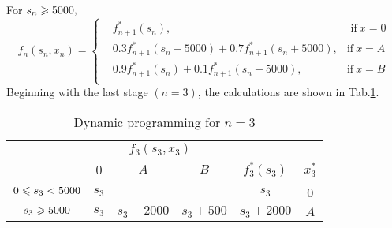 \documentclass[a4paper]{article}
\begin{document}
\begin{enumerate}
\begin{solution}
	For $s_n\geqslant5000,$
	\begin{equation*}f_n(s_n,x_n)=\left\{
		\begin{aligned}	
		&f_{n+1}^*(s_n), &\text{ if}\ x=0\, \\
		&0.3f_{n+1}^*(s_n-5000)+0.7f_{n+1}^*(s_n+5000), &\text{if}\ x=A\\
		&0.9f_{n+1}^*(s_n)+0.1f_{n+1}^*(s_n+5000), &\text{if}\ x=B\\
		\end{aligned}\right.
	\end{equation*}
	Beginning with the last stage $(n=3)$, the calculations are shown in Tab.\ref{tab33}.
	\begin{table}[H]
	  	\centering
	  	\caption{Dynamic programming for $n=3$}
	  	\label{tab33}
	  	\begin{tabular}{cccccc}
	  		\toprule[1.5pt]
	  		&\multicolumn{3}{c}{$f_3(s_3,x_3)$}&\\
	  		\cmidrule{2-4}
	  		\diagbox[width=7em]{$s_3$}{$x_3$}&\hspace*{0.4cm}0\hspace*{0.4cm}&\hspace*{0.4cm}$A$\hspace*{0.4cm}&\hspace*{0.4cm}$B$\hspace*{0.4cm}&$f_3^*(s_3)$&$x_3^*$\\
	  		\midrule
			$0\leqslant s_3<5000$&$s_3$&&&$s_3$&0\\
			$s_3\geqslant5000$&$s_3$&$s_3+2000$&$s_3+500$&$s_3+2000$&$A$\\
	  		\bottomrule[1.5pt]
	  	\end{tabular}
  	\end{table}
	

\end{solution}
\end{enumerate}
\end{document}
